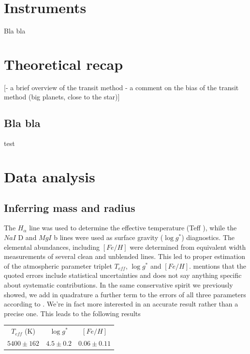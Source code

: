 \documentclass[a4paper,11pt,twocolumn]{article}
\begin{document}
\section{Instruments}

Bla bla



\section{Theoretical recap}

[- a brief overview of the transit method
- a comment on the bias of the transit method (big planets, close to the star)]




\subsection{Bla bla}

    test

\section{Data analysis}

\subsection{Inferring mass and radius}

The $H_{\alpha}$ line was used to determine the effective temperature (Teff ),
while the $NaI$ D and $MgI$ b lines were used as surface gravity
($\log{g^*}$) diagnostics. The elemental abundances, including $[Fe/H]$ 
were determined from equivalent width measurements of several clean and 
unblended lines. This led to proper estimation of the atmospheric parameter 
triplet $T_{eff}$, $\log{g^*}$ and $[Fe/H]$. \cite*{Anderson} mentions that the quoted errors 
include statistical uncertainties and does not say anything specific about 
systematic contributions. In the same conservative spirit we previously 
showed, we add in quadrature a further term to the errors of all three 
parameters according to \cite*{Sousa}. We're in fact more interested in an accurate result 
rather than a precise one.
This leads to the following results 
\begin{center}
    \begin{tabular}{|c|c|c|}
    \hline
    $T_{eff}$ (K) & $\log{g^*}$ & $[Fe/H]$ \\
    $5400 \pm 162$ & $4.5 \pm 0.2$ & $0.06 \pm 0.11$ \\
    \hline
    \end{tabular}
    \end{center}
\end{document}
